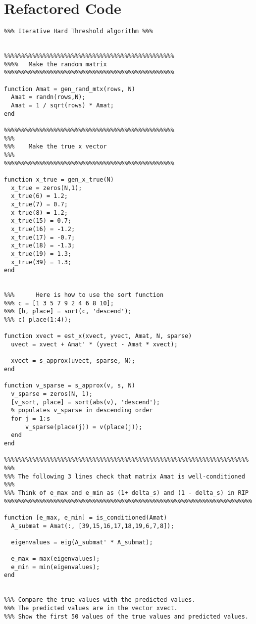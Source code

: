 \documentclass[11pt]{article}
\begin{document}
\section{Refactored Code}
\label{sec:org668ba45}
\begin{verbatim}
%%% Iterative Hard Threshold algorithm %%%


%%%%%%%%%%%%%%%%%%%%%%%%%%%%%%%%%%%%%%%%%%%%%%%%
%%%%   Make the random matrix
%%%%%%%%%%%%%%%%%%%%%%%%%%%%%%%%%%%%%%%%%%%%%%%%

function Amat = gen_rand_mtx(rows, N)
  Amat = randn(rows,N);
  Amat = 1 / sqrt(rows) * Amat;
end

%%%%%%%%%%%%%%%%%%%%%%%%%%%%%%%%%%%%%%%%%%%%%%%%
%%%
%%%    Make the true x vector
%%%
%%%%%%%%%%%%%%%%%%%%%%%%%%%%%%%%%%%%%%%%%%%%%%%%

function x_true = gen_x_true(N)
  x_true = zeros(N,1);
  x_true(6) = 1.2;
  x_true(7) = 0.7;
  x_true(8) = 1.2;
  x_true(15) = 0.7;
  x_true(16) = -1.2;
  x_true(17) = -0.7;
  x_true(18) = -1.3;
  x_true(19) = 1.3;
  x_true(39) = 1.3;
end


%%%      Here is how to use the sort function
%%% c = [1 3 5 7 9 2 4 6 8 10];
%%% [b, place] = sort(c, 'descend');
%%% c( place(1:4));

function xvect = est_x(xvect, yvect, Amat, N, sparse)
  uvect = xvect + Amat' * (yvect - Amat * xvect);

  xvect = s_approx(uvect, sparse, N);
end

function v_sparse = s_approx(v, s, N)
  v_sparse = zeros(N, 1);
  [v_sort, place] = sort(abs(v), 'descend');
  % populates v_sparse in descending order
  for j = 1:s
      v_sparse(place(j)) = v(place(j));
  end
end

%%%%%%%%%%%%%%%%%%%%%%%%%%%%%%%%%%%%%%%%%%%%%%%%%%%%%%%%%%%%%%%%%%%%%
%%%
%%% The following 3 lines check that matrix Amat is well-conditioned
%%%
%%% Think of e_max and e_min as (1+ delta_s) and (1 - delta_s) in RIP
%%%%%%%%%%%%%%%%%%%%%%%%%%%%%%%%%%%%%%%%%%%%%%%%%%%%%%%%%%%%%%%%%%%%%%

function [e_max, e_min] = is_conditioned(Amat)
  A_submat = Amat(:, [39,15,16,17,18,19,6,7,8]);

  eigenvalues = eig(A_submat' * A_submat);

  e_max = max(eigenvalues);
  e_min = min(eigenvalues);
end


%%% Compare the true values with the predicted values.
%%% The predicted values are in the vector xvect.
%%% Show the first 50 values of the true values and predicted values.



\end{verbatim}
\end{document}
